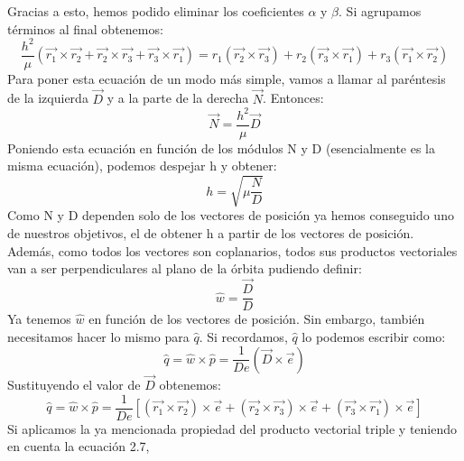 \documentclass{article}
\numberwithin{equation}{section}
\begin{document}
Gracias a esto, hemos podido eliminar los coeficientes 
$\alpha$ y $\beta$. Si agrupamos términos al final obtenemos: 
\begin{equation*}
    \frac{h^{2}}{\mu}(\overrightarrow{r_{1}}\times\overrightarrow{r_{2}}+\overrightarrow{r_{2}}\times\overrightarrow{r_{3}}+\overrightarrow{r_{3}}\times\overrightarrow{r_{1}})=r_{1}(\overrightarrow{r_{2}}\times\overrightarrow{r_{3}})+r_{2}(\overrightarrow{r_{3}}\times\overrightarrow{r_{1}})+r_{3}(\overrightarrow{r_{1}}\times\overrightarrow{r_{2}}) 
\end{equation*}
Para poner esta ecuación de un modo más simple, vamos a llamar 
al paréntesis de la izquierda $\overrightarrow{D}$ y a la 
parte de la derecha $\overrightarrow{N}$. Entonces: 
\begin{equation}
    \overrightarrow{N}=\frac{h^{2}}{\mu}\overrightarrow{D} 
\end{equation}
Poniendo esta ecuación en función de los módulos N y D (esencialmente 
es la misma ecuación), podemos despejar h y obtener: 
\begin{equation}
    h=\sqrt{\mu\frac{N}{D}}
\end{equation}
Como N y D dependen solo de los vectores de posición ya hemos 
conseguido uno de nuestros objetivos, el de obtener h a partir 
de los vectores de posición. Además, como todos los vectores son 
coplanarios, todos sus productos vectoriales van a ser perpendiculares 
al plano de la órbita pudiendo definir: 
\begin{equation}
    \hat{w}=\frac{\overrightarrow{D}}{D} 
\end{equation}
Ya tenemos $\hat{w}$ en función de los vectores de posición. Sin 
embargo, también necesitamos hacer lo mismo para $\hat{q}$.
Si recordamos, $\hat{q}$ lo podemos escribir como: 
\begin{equation*}
    \hat{q}=\hat{w}\times\hat{p}=\frac{1}{De}(\overrightarrow{D}\times\overrightarrow{e}) 
\end{equation*}
Sustituyendo el valor de $\overrightarrow{D}$ obtenemos: 
\begin{equation*}
    \hat{q}=\hat{w}\times\hat{p}=\frac{1}{De}[(\overrightarrow{r_{1}}\times\overrightarrow{r_{2}})\times\overrightarrow{e}+(\overrightarrow{r_{2}}\times\overrightarrow{r_{3}})\times\overrightarrow{e}+(\overrightarrow{r_{3}}\times\overrightarrow{r_{1}})\times\overrightarrow{e}]
\end{equation*}
Si aplicamos la ya mencionada propiedad del producto 
vectorial triple y teniendo en cuenta la ecuación 2.7, 
\end{document}
